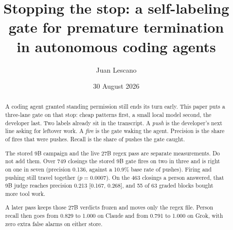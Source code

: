 \documentclass[11pt,a4paper]{article}
\title{Stopping the stop: a self-labeling gate for premature termination\\
       in autonomous coding agents}
\author{Juan Lescano}
\date{30 August 2026}
\begin{document}
\maketitle

\begin{abstract}
A coding agent granted standing permission still ends its turn early. This
paper puts a three-lane gate on that stop: cheap patterns first, a small
local model second, the developer last. Two labels already sit in the
transcript. A \emph{push} is the developer's next line asking for leftover
work. A \emph{fire} is the gate waking the agent. Precision is the share
of fires that were pushes. Recall is the share of pushes the gate caught.

The stored 9B campaign and the live 27B regex pass are separate
measurements. Do not add them. Over 749 closings the stored 9B gate
fires on two in three and is right on one in seven (precision 0.136,
against a 10.9\% base rate of pushes). Firing and pushing still travel
together ($p = 0.0007$). On the 463 closings a person answered, that
9B judge reaches precision 0.213 [0.167, 0.268], and 55 of 63 graded
blocks bought more tool work.

A later pass keeps those 27B verdicts frozen and moves only the regex
file. Person recall then goes from 0.829 to 1.000 on Claude and from
0.791 to 1.000 on Grok, with zero extra false alarms on either store.
\end{abstract}
\end{document}

